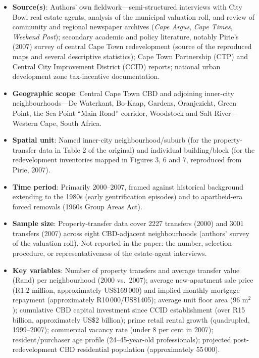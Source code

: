 \begin{itemize}
  \item \textbf{Source(s)}: Authors' own fieldwork---semi-structured interviews with City Bowl real estate agents, analysis of the municipal valuation roll, and review of community and regional newspaper archives (\emph{Cape Argus}, \emph{Cape Times}, \emph{Weekend Post}); secondary academic and policy literature, notably Pirie's (2007) survey of central Cape Town redevelopment (source of the reproduced maps and several descriptive statistics); Cape Town Partnership (CTP) and Central City Improvement District (CCID) reports; national urban development zone tax-incentive documentation.
  \item \textbf{Geographic scope}: Central Cape Town CBD and adjoining inner-city neighbourhoods---De Waterkant, Bo-Kaap, Gardens, Oranjezicht, Green Point, the Sea Point ``Main Road'' corridor, Woodstock and Salt River---Western Cape, South Africa.
  \item \textbf{Spatial unit}: Named inner-city neighbourhood/suburb (for the property-transfer data in Table 2 of the original) and individual building/block (for the redevelopment inventories mapped in Figures 3, 6 and 7, reproduced from Pirie, 2007).
  \item \textbf{Time period}: Primarily 2000--2007, framed against historical background extending to the 1980s (early gentrification episodes) and to apartheid-era forced removals (1960s Group Areas Act).
  \item \textbf{Sample size}: Property-transfer data cover 2227 transfers (2000) and 3001 transfers (2007) across eight CBD-adjacent neighbourhoods (authors' survey of the valuation roll). Not reported in the paper: the number, selection procedure, or representativeness of the estate-agent interviews.
  \item \textbf{Key variables}: Number of property transfers and average transfer value (Rand) per neighbourhood (2000 vs.\ 2007); average new-apartment sale price (R1.2 million, approximately US\$169\,000) and implied monthly mortgage repayment (approximately R10\,000/US\$1405); average unit floor area (96 m$^2$); cumulative CBD capital investment since CCID establishment (over R15 billion, approximately US\$2 billion); prime retail rental growth (quadrupled, 1999--2007); commercial vacancy rate (under 8 per cent in 2007); resident/purchaser age profile (24--45-year-old professionals); projected post-redevelopment CBD residential population (approximately 55\,000).

\end{itemize}
